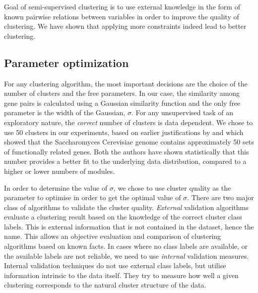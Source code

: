 \begin{figure}[p]
\centering
{}
\label{fig:spirals_cv}
\caption[Spirals dataset clustering quality improvement with increasing number of known constraints]{}
\end{figure}

Goal of semi-supervised clustering is to use external knowledge in the form of known pairwise relations between variables in order to improve the quality of clustering. We have shown that applying more constraints indeed lead to better clustering.

\subsection{Parameter optimization} \label{chap2:sec:param_opt}
For any clustering algorithm, the most important decisions are the choice of the number of clusters and the free parameters. In our case, the similarity among gene pairs is calculated using a Gaussian similarity function and the only free parameter is the width of the Gaussian, $\sigma$. For any unsupervised task of an exploratory nature, the \textit{correct} number of clusters is data dependent. We chose to use 50 clusters in our experiments, based on earlier justifications by \citet{ihmels02revealing} and \citet{segal03module} which showed that the Saccharomyces Cerevisiae genome contains approximately 50 sets of functionally related genes. Both the authors have shown statistically that this number provides a better fit to the underlying data distribution, compared to a higher or lower numbers of modules.

In order to determine the value of $\sigma$, we chose to use cluster quality as the parameter to optimise in order to get the optimal value of $\sigma$. There are two major class of algorithms 
to validate the cluster quality. \textit{External} validation algorithms evaluate a clustering result based on the knowledge of the correct 
cluster class labels. This is external information that is not contained in the dataset, hence the name. This allows an objective evaluation and comparison of clustering algorithms based on known facts. In cases where no class labels are available, or the available labels are not reliable, 
we need to use \textit{internal} validation measures. Internal validation techniques do not use external class labels, but utilise information intrinsic to the data itself. They try to measure how well a given clustering corresponds to the natural cluster structure of the data.


